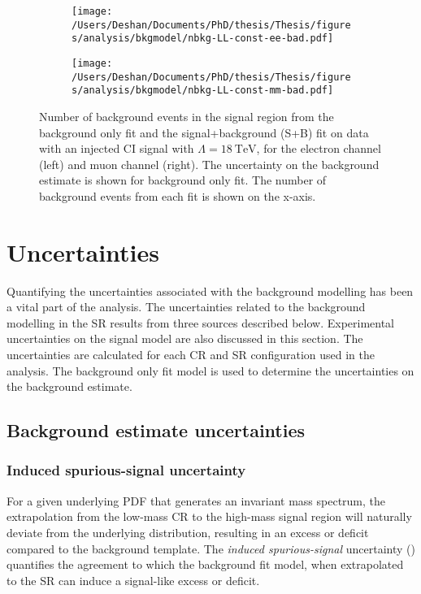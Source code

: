 \begin{figure}[h!]
    \centering
    \begin{subfigure}[b]{0.49\textwidth}
        \centering
        \texttt{[image: /Users/Deshan/Documents/PhD/thesis/Thesis/figures/analysis/bkgmodel/nbkg-LL-const-ee-bad.pdf]}
        \label{fig:bkgmodel:fitsbplusb1bad}
    \end{subfigure}
    \begin{subfigure}[b]{0.49\textwidth}
        \centering
        \texttt{[image: /Users/Deshan/Documents/PhD/thesis/Thesis/figures/analysis/bkgmodel/nbkg-LL-const-mm-bad.pdf]}
        \label{fig:bkgmodel:fitsbplusb2bad}
    \end{subfigure}
    \caption[Background estimation comparisons of the signal+background fit and background only fit in an invalid CR choice.]{Number of background events in the signal region from the background only fit and the signal+background (S+B) fit on data with an injected CI signal with $\Lambda = \SI{18}{\tera\electronvolt}$, for the electron channel (left) and muon channel (right). The uncertainty on the background estimate is shown for background only fit. The number of background events from each fit is shown on the x-axis.}
    \label{fig:bkgmodel:fitsbplusbbad}
\end{figure}

\section{Uncertainties}\label{sec:extrap:uncertainties}
Quantifying the uncertainties associated with the background modelling has been a vital part of the analysis. The uncertainties related to the background modelling in the SR results from three sources described below. Experimental uncertainties on the signal model are also discussed in this section. The uncertainties are calculated for each CR and SR configuration used in the analysis. The background only fit model is used to determine the uncertainties on the background estimate. 

\subsection{Background estimate uncertainties}

\subsubsection{Induced spurious-signal uncertainty}
For a given underlying PDF that generates an invariant mass spectrum, the extrapolation from the low-mass CR to the high-mass signal region will naturally deviate from the underlying distribution, resulting in an excess or deficit compared to the background template. The \emph{induced spurious-signal} uncertainty (\ISSU) quantifies the agreement to which the background fit model, when extrapolated to the SR can induce a signal-like excess or deficit. 

